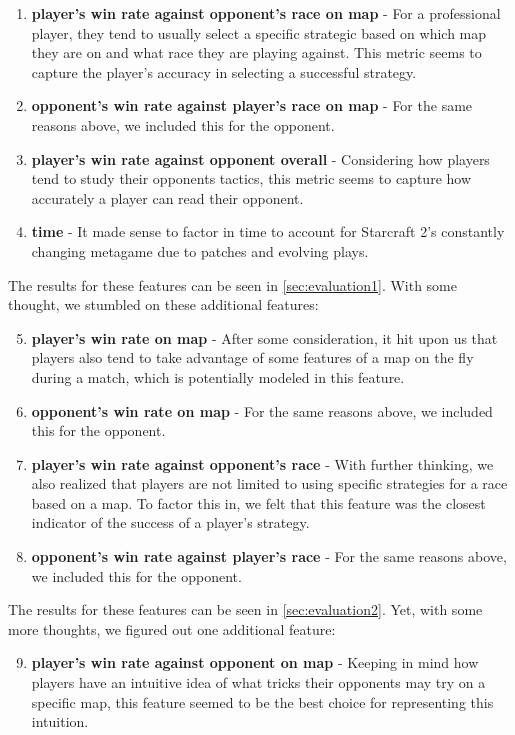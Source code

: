 \begin{enumerate}
\item \textbf{player's win rate against opponent's race on map} - For a professional player, they tend to usually select a specific strategic based on which map they are on and what race they are playing against. This metric seems to capture the player's accuracy in selecting a successful strategy.
\item \textbf{opponent's win rate against player's race on map} - For the same reasons above, we included this for the opponent.
\item \textbf{player's win rate against opponent overall} - Considering how players tend to study their opponents tactics, this metric seems to capture how accurately a player can read their opponent.
\item \textbf{time} - It made sense to factor in time to account for Starcraft 2's constantly changing metagame due to patches and evolving plays.
\end{enumerate}

The results for these features can be seen in \ref{sec:evaluation1}. With some thought, we stumbled on these additional features:

\begin{enumerate}
\setcounter{enumi}{4}
\item \textbf{player's win rate on map} - After some consideration, it hit upon us that players also tend to take advantage of some features of a map on the fly during a match, which is potentially modeled in this feature.
\item \textbf{opponent's win rate on map} - For the same reasons above, we included this for the opponent.
\item \textbf{player's win rate against opponent's race} - With further thinking, we also realized that players are not limited to using specific strategies for a race based on a map. To factor this in, we felt that this feature was the closest indicator of the success of a player's strategy.
\item \textbf{opponent's win rate against player's race} - For the same reasons above, we included this for the opponent.
\end{enumerate}

The results for these features can be seen in \ref{sec:evaluation2}. Yet, with some more thoughts, we figured out one additional feature:

\begin{enumerate}
\setcounter{enumi}{8}
\item \textbf{player's win rate against opponent on map} - Keeping in mind how players have an intuitive idea of what tricks their opponents may try on a specific map, this feature seemed to be the best choice for representing this intuition.
\end{enumerate}

